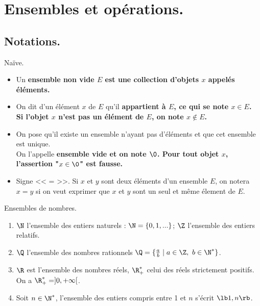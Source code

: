 \documentclass[11pt]{article}
\begin{document}


\thispagestyle{fancy}

\section{Ensembles et opérations.}

\subsection{Notations.}

\begin{defi}{Naïve.}{}
    \begin{itemize}
        \item Un \bf{ensemble} non vide $E$ est une collection d'objets $x$ appelés \bf{éléments}.
        \item On dit d'un élément $x$ de $E$ qu'il \bf{appartient} à $E$, ce qui se note $x\in E$.\\
        Si l'objet $x$ n'est pas un élément de $E$, on note $x\notin E$.
        \item On pose qu'il existe un ensemble n'ayant pas d'éléments et que cet ensemble est unique.\\
        On l'appelle \bf{ensemble vide} et on note $\0$. Pour tout objet $x$, l'assertion "$x\in\0$" est fausse.
        \item Signe << = >>. Si $x$ et $y$ sont deux éléments d'un ensemble $E$, on notera $x=y$ si on veut exprimer que $x$ et $y$ sont un seul et même élement de $E$.
    \end{itemize}
\end{defi}

\begin{ex}{Ensembles de nombres.}{}
    \begin{enumerate}
        \item $\N$ l'ensemble des entiers naturels : $\N=\{0,1,...\}$; $\Z$ l'ensemble des entiers relatifs.
        \item $\Q$ l'ensemble des nombres rationnels $\Q=\{\frac{a}{b}\mid a\in\Z,~ b\in\N^*\}$.
        \item $\R$ est l'ensemble des nombres réels,  $\R_+^*$ celui des réels strictement positifs. On a $\R_+^*=]0,+\infty[$.
        \item Soit $n\in\N^*$, l'ensemble des entiers compris entre 1 et $n$ s'écrit $\lb1,n\rb$.
    \end{enumerate}
\end{ex}
\end{document}
